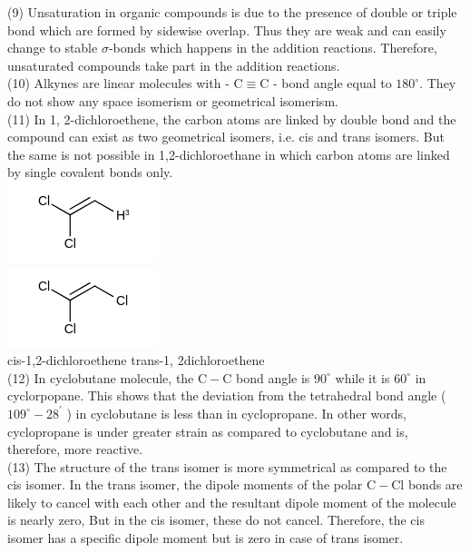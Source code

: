 \documentclass[10pt]{article}
\begin{document}
(9) Unsaturation in organic compounds is due to the presence of double or triple bond which are formed by sidewise overlap. Thus they are weak and can easily change to stable $\sigma$-bonds which happens in the addition reactions. Therefore, unsaturated compounds take part in the addition reactions.\\
(10) Alkynes are linear molecules with - $\mathrm{C} \equiv \mathrm{C}$ - bond angle equal to $180^{\circ}$. They do not show any space isomerism or geometrical isomerism.\\
(11) In 1, 2-dichloroethene, the carbon atoms are linked by double bond and the compound can exist as two geometrical isomers, i.e. cis and trans isomers. But the same is not possible in 1,2-dichloroethane in which carbon atoms are linked by single covalent bonds only.\\
\includegraphics{smile-edc6dcd5e5b3d10ec017c382401fa96b941e3a46}\\
\includegraphics{smile-30097d7736be41ad03f09338ef7df3732ee42cac}\\
cis-1,2-dichloroethene trans-1, 2dichloroethene\\
(12) In cyclobutane molecule, the $\mathrm{C}-\mathrm{C}$ bond angle is $90^{\circ}$ while it is $60^{\circ}$ in cyclorpopane. This shows that the deviation from the tetrahedral bond angle ( $109^{\circ}-28^{\prime}$ ) in cyclobutane is less than in cyclopropane. In other words, cyclopropane is under greater strain as compared to cyclobutane and is, therefore, more reactive.\\
(13) The structure of the trans isomer is more symmetrical as compared to the cis isomer. In the trans isomer, the dipole moments of the polar $\mathrm{C}-\mathrm{Cl}$ bonds are likely to cancel with each other and the resultant dipole moment of the molecule is nearly zero, But in the cis isomer, these do not cancel. Therefore, the cis isomer has a specific dipole moment but is zero in case of trans isomer.\\
\end{document}
